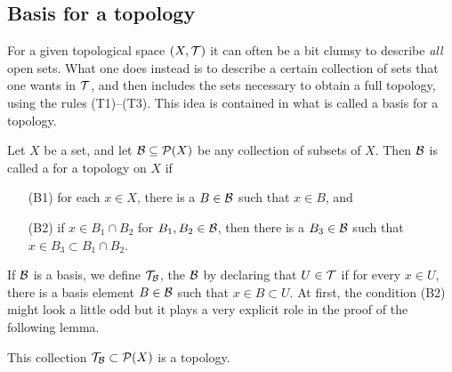 \subsection{Basis for a topology}
For a given topological space $(X,\mathcal{T})$ it can often be a bit clumsy to describe \emph{all} open sets. What one does instead is to describe a certain collection of sets that one wants in $\mathcal{T}$, and then includes the sets necessary to obtain a full topology, using the rules (T1)--(T3). This idea is contained in what is called a basis for a topology.
\begin{defn}
  Let $X$ be a set, and let $\mathcal{B} \subseteq \mathcal{P}(X)$ be any collection of subsets of $X$. Then $\mathcal{B}$ is called a  for a topology on $X$ if
  \begin{enumerate}
    \item[(B1)] for each $x \in X$, there is a $B \in \mathcal{B}$ such that $x \in B$, and
    \item[(B2)] if $x \in B_1 \cap B_2$ for $B_1, B_2 \in \mathcal{B}$, then there is a $B_3 \in \mathcal{B}$ such that $x \in B_3 \subset B_1 \cap B_2$.
  \end{enumerate}
\end{defn}
If $\mathcal{B}$ is a basis, we define $\mathcal{T}_{\mathcal{B}}$, the  $\mathcal{B}$ by declaring that $U \in \mathcal{T}$ if for every $x \in U$, there is a basis element $B \in \mathcal{B}$ such that $x \in B \subset U$. At first, the condition (B2) might look a little odd but it plays a very explicit role in the proof of the following lemma.
\begin{lem}
  This collection $\mathcal{T}_{\mathcal{B}} \subset \mathcal{P}(X)$ is a topology.
\end{lem}
